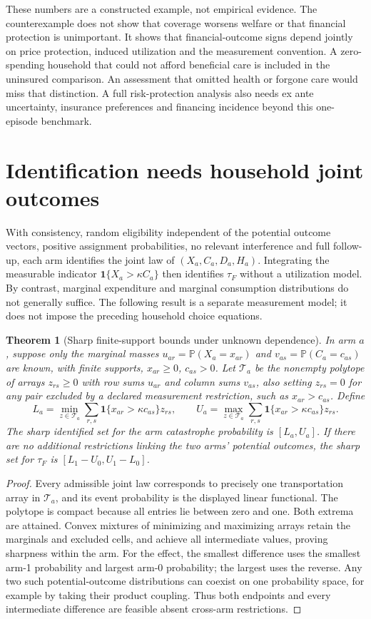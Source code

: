 \documentclass[11pt]{article}
\newtheorem{theorem}{Theorem}
\theoremstyle{remark}\newtheorem{remark}[theorem]{Remark}
\newcommand{\Prb}{\mathbb P}
\newcommand{\ind}{\mathbf 1}
\begin{document}
These numbers are a constructed example, not empirical evidence. The counterexample does not show that coverage worsens welfare or that financial protection is unimportant. It shows that financial-outcome signs depend jointly on price protection, induced utilization and the measurement convention. A zero-spending household that could not afford beneficial care is included in the uninsured comparison. An assessment that omitted health or forgone care would miss that distinction. A full risk-protection analysis also needs ex ante uncertainty, insurance preferences and financing incidence beyond this one-episode benchmark.

\section*{Identification needs household joint outcomes}
With consistency, random eligibility independent of the potential outcome vectors, positive assignment probabilities, no relevant interference and full follow-up, each arm identifies the joint law of $(X_a,C_a,D_a,H_a)$. Integrating the measurable indicator $\ind\{X_a>\kappa C_a\}$ then identifies $\tau_F$ without a utilization model. By contrast, marginal expenditure and marginal consumption distributions do not generally suffice. The following result is a separate measurement model; it does not impose the preceding household choice equations.

\begin{theorem}[Sharp finite-support bounds under unknown dependence]
In arm $a$, suppose only the marginal masses $u_{ar}=\Prb(X_a=x_{ar})$ and $v_{as}=\Prb(C_a=c_{as})$ are known, with finite supports, $x_{ar}\ge0$, $c_{as}>0$. Let $\mathcal T_a$ be the nonempty polytope of arrays $z_{rs}\ge0$ with row sums $u_{ar}$ and column sums $v_{as}$, also setting $z_{rs}=0$ for any pair excluded by a declared measurement restriction, such as $x_{ar}>c_{as}$. Define
\[
 L_a=\min_{z\in\mathcal T_a}\sum_{r,s}\ind\{x_{ar}>\kappa c_{as}\}z_{rs},\qquad
 U_a=\max_{z\in\mathcal T_a}\sum_{r,s}\ind\{x_{ar}>\kappa c_{as}\}z_{rs}.
\]
The sharp identified set for the arm catastrophe probability is $[L_a,U_a]$. If there are no additional restrictions linking the two arms' potential outcomes, the sharp set for $\tau_F$ is $[L_1-U_0,U_1-L_0]$.
\end{theorem}
\begin{proof}
Every admissible joint law corresponds to precisely one transportation array in $\mathcal T_a$, and its event probability is the displayed linear functional. The polytope is compact because all entries lie between zero and one. Both extrema are attained. Convex mixtures of minimizing and maximizing arrays retain the marginals and excluded cells, and achieve all intermediate values, proving sharpness within the arm. For the effect, the smallest difference uses the smallest arm-1 probability and largest arm-0 probability; the largest uses the reverse. Any two such potential-outcome distributions can coexist on one probability space, for example by taking their product coupling. Thus both endpoints and every intermediate difference are feasible absent cross-arm restrictions.
\end{proof}
\end{document}
